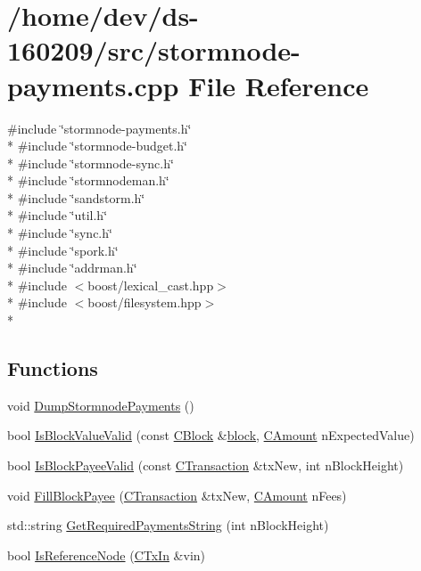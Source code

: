 \hypertarget{stormnode-payments_8cpp}{}\section{/home/dev/ds-\/160209/src/stormnode-\/payments.cpp File Reference}
\label{stormnode-payments_8cpp}
{\ttfamily \#include \char`\"{}stormnode-\/payments.\+h\char`\"{}}\\*
{\ttfamily \#include \char`\"{}stormnode-\/budget.\+h\char`\"{}}\\*
{\ttfamily \#include \char`\"{}stormnode-\/sync.\+h\char`\"{}}\\*
{\ttfamily \#include \char`\"{}stormnodeman.\+h\char`\"{}}\\*
{\ttfamily \#include \char`\"{}sandstorm.\+h\char`\"{}}\\*
{\ttfamily \#include \char`\"{}util.\+h\char`\"{}}\\*
{\ttfamily \#include \char`\"{}sync.\+h\char`\"{}}\\*
{\ttfamily \#include \char`\"{}spork.\+h\char`\"{}}\\*
{\ttfamily \#include \char`\"{}addrman.\+h\char`\"{}}\\*
{\ttfamily \#include $<$boost/lexical\+\_\+cast.\+hpp$>$}\\*
{\ttfamily \#include $<$boost/filesystem.\+hpp$>$}\\*
\subsection*{Functions}
\begin{DoxyCompactItemize}
\item 
void \hyperlink{stormnode-payments_8cpp_ae992438141f991b3ca132d11da230d1a}{Dump\+Stormnode\+Payments} ()
\item 
bool \hyperlink{stormnode-payments_8cpp_a775fd7f6eef6c395268172c278b9100b}{Is\+Block\+Value\+Valid} (const \hyperlink{class_c_block}{C\+Block} \&\hyperlink{core_8h_ace80c27428e237fe24f54ae915a36133}{block}, \hyperlink{amount_8h_a4eaf3a5239714d8c45b851527f7cb564}{C\+Amount} n\+Expected\+Value)
\item 
bool \hyperlink{stormnode-payments_8cpp_af9e474d79a12729ed3e96b0d1c0351b4}{Is\+Block\+Payee\+Valid} (const \hyperlink{class_c_transaction}{C\+Transaction} \&tx\+New, int n\+Block\+Height)
\item 
void \hyperlink{stormnode-payments_8cpp_a1c78c12ef9ef9becb2701ac56c3996ec}{Fill\+Block\+Payee} (\hyperlink{class_c_transaction}{C\+Transaction} \&tx\+New, \hyperlink{amount_8h_a4eaf3a5239714d8c45b851527f7cb564}{C\+Amount} n\+Fees)
\item 
std\+::string \hyperlink{stormnode-payments_8cpp_a7828ab0b9a1302db35b658f727b260e1}{Get\+Required\+Payments\+String} (int n\+Block\+Height)
\item 
bool \hyperlink{stormnode-payments_8cpp_a0bca99aa555725c39171cc06fb3e94de}{Is\+Reference\+Node} (\hyperlink{class_c_tx_in}{C\+Tx\+In} \&vin)
\end{DoxyCompactItemize}
